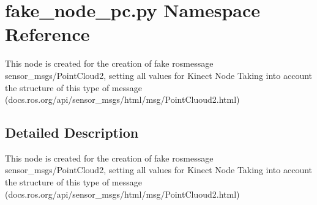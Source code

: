\hypertarget{namespacefake__node__pc_1_1py}{}\section{fake\+\_\+node\+\_\+pc.\+py Namespace Reference}
\label{namespacefake__node__pc_1_1py}


This node is created for the creation of fake rosmessage sensor\+\_\+msgs/\+Point\+Cloud2, setting all values for Kinect Node Taking into account the structure of this type of message (docs.\+ros.\+org/api/sensor\+\_\+msgs/html/msg/\+Point\+Cluoud2.html)  




\subsection{Detailed Description}
This node is created for the creation of fake rosmessage sensor\+\_\+msgs/\+Point\+Cloud2, setting all values for Kinect Node Taking into account the structure of this type of message (docs.\+ros.\+org/api/sensor\+\_\+msgs/html/msg/\+Point\+Cluoud2.html) 